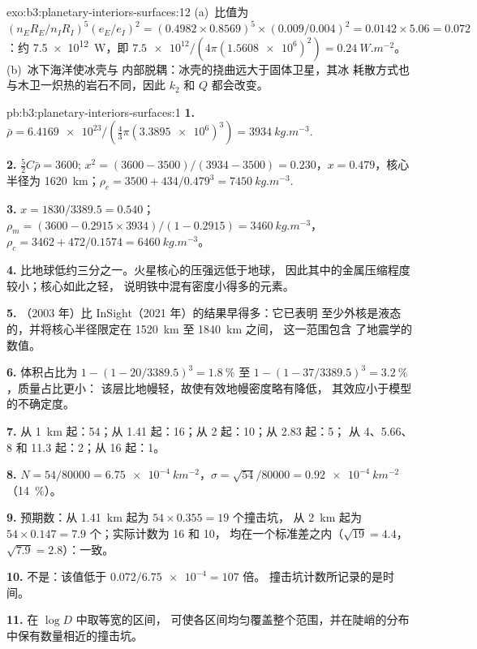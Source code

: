 \begin{solution}{exo:b3:planetary-interiors-surfaces:12}
(a)~比值为 $(n_ER_E/n_IR_I)^5(e_E/e_I)^2 = (0.4982\times0.8569)^5
\times(0.009/0.004)^2 = 0.0142\times5.06 = 0.072$：约
\qty{7.5e12}{W}，即 $\num{7.5e12}/(4\pi(\num{1.5608e6})^2) =
\qty{0.24}{W.m^{-2}}$。(b)~冰下海洋使冰壳与
内部脱耦：冰壳的挠曲远大于固体卫星，其冰
耗散方式也与木卫一炽热的岩石不同，因此 $k_2$ 和 $Q$ 都会改变。
\end{solution}

\begin{solution}{pb:b3:planetary-interiors-surfaces:1}
\textbf{1.} $\bar\rho = \num{6.4169e23}/(\tfrac43\pi(\num{3.3895e6})^3) =
\qty{3934}{kg.m^{-3}}$.

\textbf{2.} $\tfrac52C\bar\rho = 3600$; $x^2 = (3600 - 3500)/(3934 - 3500) =
0.230$，$x = 0.479$，核心半径为 \qty{1620}{km}；$\rho_c = 3500 +
434/0.479^3 = \qty{7450}{kg.m^{-3}}$.

\textbf{3.} $x = 1830/3389.5 = 0.540$；$\rho_m = (3600 - 0.2915\times
3934)/(1 - 0.2915) = \qty{3460}{kg.m^{-3}}$，$\rho_c = 3462 +
472/0.1574 = \qty{6460}{kg.m^{-3}}$。

\textbf{4.} 比地球低约三分之一。火星核心的压强远低于地球，
因此其中的金属压缩程度较小；核心如此之轻，
说明铁中混有密度小得多的元素。

\textbf{5.} （2003 年）比 InSight（2021 年）的结果早得多：它已表明
至少外核是液态的，并将核心半径限定在 \qty{1520}{km} 至 \qty{1840}{km} 之间，
这一范围包含
了地震学的数值。

\textbf{6.} 体积占比为 $1 - (1 - 20/3389.5)^3 = \qty{1.8}{\percent}$ 至 $1 - (1 -
37/3389.5)^3 = \qty{3.2}{\percent}$，质量占比更小：
该层比地幔轻，故使有效地幔密度略有降低，
其效应小于模型的不确定度。

\textbf{7.} 从 \qty{1}{km} 起：54；从 1.41 起：16；从 2 起：10；从 2.83 起：5；
从 4、5.66、8 和 11.3 起：2；从 16 起：1。

\textbf{8.} $N = 54/80000 = \qty{6.75e-4}{km^{-2}}$，$\sigma = \sqrt{54}/80000
= \qty{0.92e-4}{km^{-2}}$（\qty{14}{\percent}）。

\textbf{9.} 预期数：从 \qty{1.41}{km} 起为 $54\times0.355 = 19$ 个撞击坑，
从 \qty{2}{km} 起为 $54\times0.147 = 7.9$ 个；实际计数为 16 和 10，
均在一个标准差之内（$\sqrt{19} = 4.4$，$\sqrt{7.9} = 2.8$）：一致。

\textbf{10.} 不是：该值低于 $0.072/\num{6.75e-4} = 107$ 倍。
撞击坑计数所记录的是时间。

\textbf{11.} 在 $\log D$ 中取等宽的区间，
可使各区间均匀覆盖整个范围，并在陡峭的分布中保有数量相近的撞击坑。


\end{solution}
